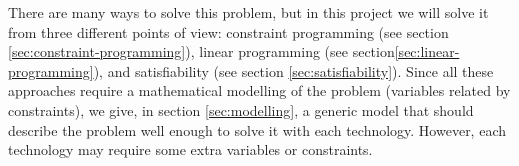 There are many ways to solve this problem, but in this project we will solve it from
three different points of view: constraint programming (see section \ref{sec:constraint-programming}),
linear programming (see section\ref{sec:linear-programming}), and satisfiability (see
section \ref{sec:satisfiability}). Since all these approaches require a mathematical modelling
of the problem (variables related by constraints), we give, in section \ref{sec:modelling},
a generic model that should describe the problem well enough to solve it with each technology.
However, each technology may require some extra variables or constraints.
